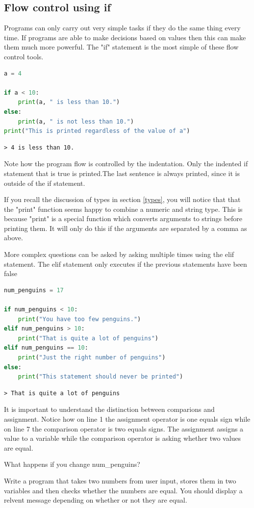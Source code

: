 	\subsection{Flow control using if}
		Programs can only carry out very simple tasks if they do the same thing every time. If programs are able to make decisions based on values then this can make them much more powerful. The "if" statement is the most simple of these flow control tools.
		
		\begin{lstlisting}[language=Python]
a = 4

if a < 10:
	print(a, " is less than 10.")
else:
	print(a, " is not less than 10.")
print("This is printed regardless of the value of a")\end{lstlisting}
		\begin{verbatim}> 4 is less than 10.\end{verbatim}	
		Note how the program flow is controlled by the indentation. Only the indented if statement that is true is printed.The last sentence is always printed, since it is outside of the if statement.
		
		If you recall the discussion of types in section \ref{types}, you will notice that that the "print" function seems happy to combine a numeric and string type. This is because "print" is a special function which converts arguments to strings before printing them. It will only do this if the arguments are separated by a comma as above.
		
		More complex questions can be asked by asking multiple times using the elif statement. The elif statement only executes if the previous statements have been false
		\begin{lstlisting}[language=Python]
num_penguins = 17

if num_penguins < 10:
	print("You have too few penguins.")
elif num_penguins > 10:
	print("That is quite a lot of penguins")
elif num_penguins == 10:
	print("Just the right number of penguins")
else:
	print("This statement should never be printed")\end{lstlisting}
		\begin{verbatim}> That is quite a lot of penguins\end{verbatim}
		It is important to understand the distinction between comparions and assignment. Notice how on line 1 the assignment operator is one equals sign while on line 7 the comparison operator is two equals signs. The assignment assigns a value to a variable while the comparison operator is asking whether two values are equal.
		\begin{task}What happens if you change num\_penguins?\end{task}
		\begin{task}Write a program that takes two numbers from user input, stores them in two variables and then checks whether the numbers are equal. You should display a relvent message depending on whether or not they are equal.\end{task}


